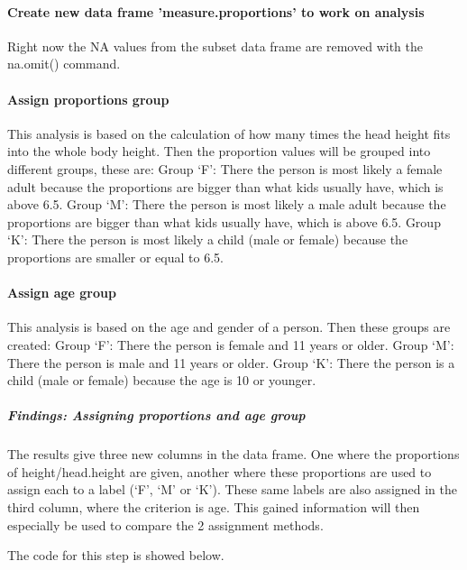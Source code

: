 \documentclass[]{article}
\begin{document}
\paragraph{Create new data frame 'measure.proportions' to work on analysis}
\label{sec:appendix-create-data-frame-no-NA}

Right now the NA values from the subset data frame are removed with the
na.omit() command.

\paragraph{Assign proportions group}
\label{sec:appendix-assign-proportions-group}

This analysis is based on the calculation of how many times the head
height fits into the whole body height. Then the proportion values will
be grouped into different groups, these are: Group `F': There the person
is most likely a female adult because the proportions are bigger than
what kids usually have, which is above 6.5. Group `M': There the person
is most likely a male adult because the proportions are bigger than what
kids usually have, which is above 6.5. Group `K': There the person is
most likely a child (male or female) because the proportions are smaller
or equal to 6.5.

\paragraph{Assign age group}
\label{sec:appendix-assign-age-group}

This analysis is based on the age and gender of a person. Then these
groups are created: Group `F': There the person is female and 11 years
or older. Group `M': There the person is male and 11 years or older.
Group `K': There the person is a child (male or female) because the age
is 10 or younger.

\subparagraph{Findings: Assigning proportions and age group}
\label{sec:appendix-findings-assign-age-group}

The results give three new columns in the data frame. One where the
proportions of height/head.height are given, another where these
proportions are used to assign each to a label (`F', `M' or `K'). These
same labels are also assigned in the third column, where the criterion
is age. This gained information will then especially be used to compare
the 2 assignment methods.

The code for this step is showed below.
\end{document}
